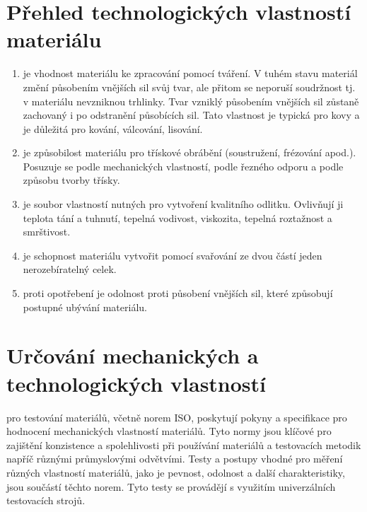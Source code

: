 \documentclass[letterpaper,10pt,english]{jupyterBook}
\begin{document}
\section{Přehled technologických vlastností materiálu}
\label{\detokenize{Prednasky/2_1_Mechanick_xe9_vlastnosti_materi_xe1lu:prehled-technologickych-vlastnosti-materialu}}\begin{enumerate}
%
\item {} 
\sphinxAtStartPar
{}  je vhodnost materiálu ke zpracování pomocí tváření. V tuhém stavu materiál změní působením vnějších sil svůj tvar, ale přitom se neporuší soudržnost \sphinxhyphen{} tj. v materiálu nevzniknou trhlinky. Tvar vzniklý působením vnějších sil zůstaně zachovaný i po odstranění působících sil. Tato vlastnost je typická pro kovy a je důležitá pro kování, válcování, lisování.

\item {} 
\sphinxAtStartPar
{} je způsobilost materiálu pro třískové obrábění (soustružení, frézování apod.). Posuzuje se podle mechanických vlastností, podle řezného odporu a podle způsobu tvorby třísky.

\item {} 
\sphinxAtStartPar
{} je soubor vlastností nutných pro vytvoření kvalitního odlitku. Ovlivňují ji teplota tání a tuhnutí, tepelná vodivost, viskozita, tepelná roztažnost a smrštivost.

\item {} 
\sphinxAtStartPar
{} je schopnost materiálu vytvořit pomocí svařování ze dvou částí jeden nerozebíratelný celek.

\item {} 
\sphinxAtStartPar
{} proti opotřebení je odolnost proti působení vnějších sil, které způsobují postupné ubývání materiálu.

\end{enumerate}


\section{Určování mechanických a technologických vlastností}
\label{\detokenize{Prednasky/2_1_Mechanick_xe9_vlastnosti_materi_xe1lu:urcovani-mechanickych-a-technologickych-vlastnosti}}
\sphinxAtStartPar
{} pro testování materiálů, včetně norem ISO, poskytují pokyny a specifikace pro hodnocení mechanických vlastností materiálů. Tyto normy jsou klíčové pro zajištění konzistence a spolehlivosti při používání materiálů a testovacích metodik napříč různými průmyslovými odvětvími. Testy a postupy vhodné pro měření různých vlastností materiálů, jako je pevnost, odolnost a další charakteristiky, jsou součástí těchto norem. Tyto testy se provádějí s využitím univerzálních testovacích strojů.
\end{document}
